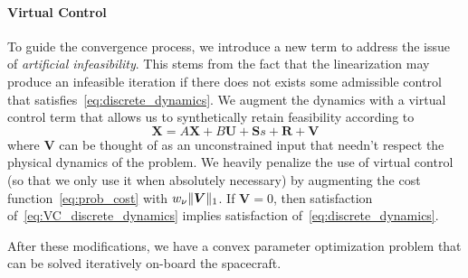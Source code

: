 \documentclass[10pt]{article}
\begin{document}
\paragraph{Virtual Control}

To guide the convergence process, we introduce a new term to address the issue of \textit{artificial infeasibility}. This stems from the fact that the linearization may produce an infeasible iteration if there does not exists some admissible control that satisfies~\eqref{eq:discrete_dynamics}. We augment the dynamics with a virtual control term that allows us to synthetically retain feasibility according to
\begin{equation}
\bm{X} = A \bm{X} + B \bm{U} + \bm{S} s + \bm{R} + \bm{V}
\label{eq:VC_discrete_dynamics}
\end{equation}
where $\bm{V}$ can be thought of as an unconstrained input that needn't respect the physical dynamics of the problem. We heavily penalize the use of virtual control (so that we only use it when absolutely necessary) by augmenting the cost function~\eqref{eq:prob_cost} with $w_{\nu} \| \bm{V} \|_1$. If $\bm{V}=0$, then satisfaction of~\eqref{eq:VC_discrete_dynamics} implies satisfaction of~\eqref{eq:discrete_dynamics}.

After these modifications, we have a convex parameter optimization problem that can be solved iteratively on-board the spacecraft. 
\end{document}
